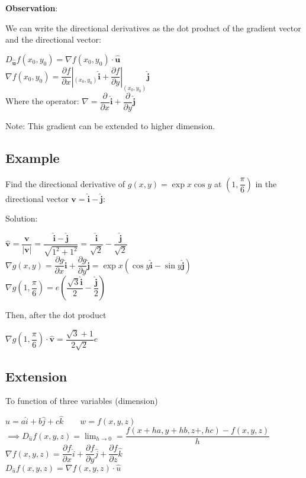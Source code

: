 \documentclass[UTF8,a4paper, 10pt, openany]{svmono}
\begin{document}
\textbf{Observation}:

We can write the directional derivatives as the dot product of the gradient vector and the directional vector:

\begin{center}
$D_{\mathbf{\hat{u}}}f(x_0,y_0)=\nabla f(x_0,y_0)\cdot \mathbf{\hat{u}}$\\
$\nabla f(x_0,y_0)=\dfrac{\partial f}{\partial x}|_{(x_0,y_0)}\mathbf{\hat{i}}+\dfrac{\partial f}{\partial y}|_{(x_0,y_0)}\mathbf{\hat{j}}$\\
Where the operator: $\nabla = \dfrac{\partial }{\partial x}\mathbf{\hat{i}}+\dfrac{\partial }{\partial y}\mathbf{\hat{j}}$
\end{center}

Note: This gradient can be extended to higher dimension.
\subsection{Example}
Find the directional derivative of $g(x,y)=\exp{x}\cos y$ at $(1,\dfrac{\pi}{6})$ in the directional vector $\mathbf{v}=\mathbf{\hat{i}}-\mathbf{\hat{j}}$:

Solution:
\begin{center}
$\mathbf{\hat{v}}=\dfrac{\mathbf{v}}{|\mathbf{v}|}=\dfrac{\mathbf{\hat{i}}-\mathbf{\hat{j}}}{\sqrt{1^2+1^2}}=\dfrac{\mathbf{\hat{i}}}{\sqrt{2}}-\dfrac{\mathbf{\hat{j}}}{\sqrt{2}}$\\
$\nabla g(x,y)=\dfrac{\partial g}{\partial x}\mathbf{\hat{i}}+\dfrac{\partial g}{\partial y}\mathbf{\hat{j}}=\exp{x}(\cos y\mathbf{\hat{i}}-\sin y\mathbf{\hat{j}})$\\
$\nabla g(1,\dfrac{\pi}{6})=e (\dfrac{\sqrt{3}\mathbf{\hat{i}}}{2}-\dfrac{\mathbf{\hat{j}}}{2})$
\end{center}

Then, after the dot product

\begin{center}
$\nabla g(1,\dfrac{\pi}{6})\cdot \mathbf{\hat{v}}=\dfrac{\sqrt{3}+1}{2\sqrt{2}}e$
\end{center}

\subsection{Extension}
To function of three variables (dimension)

\begin{center}
$\hat{u}=a\hat{i}+b\hat{j}+c\hat{k} \qquad w=f(x,y,z)$\\
$\implies D_{\hat{u}}f(x,y,z)=\displaystyle\lim_{h\rightarrow 0}=\dfrac{f(x+ha,y+hb,z+,hc)-f(x,y,z)}{h}$\\
$\nabla f(x,y,z)=\dfrac{\partial f}{\partial x}\hat{i}+\dfrac{\partial f}{\partial y}\hat{j}+\dfrac{\partial f}{\partial z}\hat{k}$\\
$\boxed{D_{\hat{u}}f(x,y,z)=\nabla f(x,y,z)\cdot \hat{u}}$
\end{center}
\end{document}
